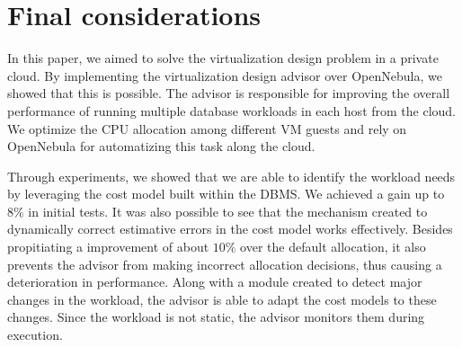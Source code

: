 \chapter{\textbf{Final considerations}}


In this paper, we aimed to solve the virtualization design problem in a private cloud. By implementing the virtualization design advisor over OpenNebula, we showed that this is possible. The advisor is responsible for improving the overall performance of running multiple database workloads in each host from the cloud. We optimize the CPU allocation among different VM guests and rely on OpenNebula for automatizing this task along the cloud.

Through experiments, we showed that we are able to identify the workload needs by leveraging the cost model built within the DBMS. We achieved a gain up to $8\%$ in initial tests. It was also possible to see that the mechanism created to dynamically correct estimative errors in the cost model works effectively. Besides propitiating a improvement of about $10\%$ over the default allocation, it also prevents the advisor from making incorrect allocation decisions, thus causing a deterioration in performance. Along with a module created to detect major changes in the workload, the advisor is able to adapt the cost models to these changes. Since the workload is not static, the advisor monitors them during execution. 




